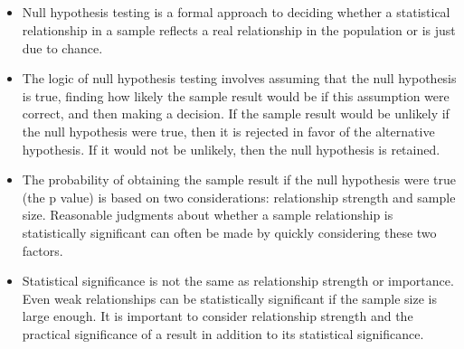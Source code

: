 \subsection{}
\begin{fullwidth}
\begin{itemize}
\item Null hypothesis testing is a formal approach to deciding whether a statistical relationship in a sample reflects a real relationship in the population or is just due to chance.

\item The logic of null hypothesis testing involves assuming that the null hypothesis is true, finding how likely the sample result would be if this assumption were correct, and then making a decision. If the sample result would be unlikely if the null hypothesis were true, then it is rejected in favor of the alternative hypothesis. If it would not be unlikely, then the null hypothesis is retained.

\item The probability of obtaining the sample result if the null hypothesis were true (the p value) is based on two considerations: relationship strength and sample size. Reasonable judgments about whether a sample relationship is statistically significant can often be made by quickly considering these two factors.

\item Statistical significance is not the same as relationship strength or importance. Even weak relationships can be statistically significant if the sample size is large enough. It is important to consider relationship strength and the practical significance of a result in addition to its statistical significance.

\end{itemize}
\end{fullwidth}

 

